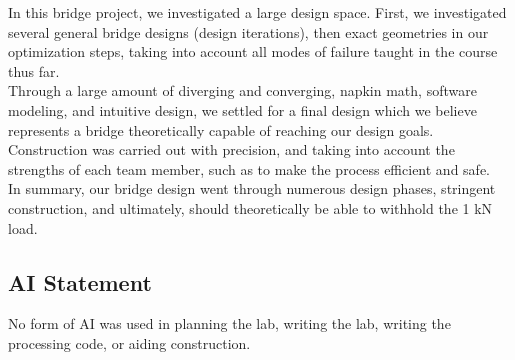 \documentclass[prl,twocolumn,secnumarabic, amsmath,amssymb,superscriptaddress]{revtex4-2}
\begin{document}
In this bridge project, we investigated a large design space. First, we investigated several general bridge designs (design iterations), then exact geometries in our optimization steps, taking into account all modes of failure taught in the course thus far. \\

Through a large amount of diverging and converging, napkin math, software modeling, and intuitive design, we settled for a final design which we believe represents a bridge theoretically capable of reaching our design goals. \\

Construction was carried out with precision, and taking into account the strengths of each team member, such as to make the process efficient and safe. \\

In summary, our bridge design went through numerous design phases, stringent construction, and ultimately, should theoretically be able to withhold the 1 kN load. \\

\vspace{340pt}


\onecolumngrid
\newpage




\subsection{AI Statement}

No form of AI was used in planning the lab, writing the lab, writing the processing code, or aiding construction.
\end{document}
